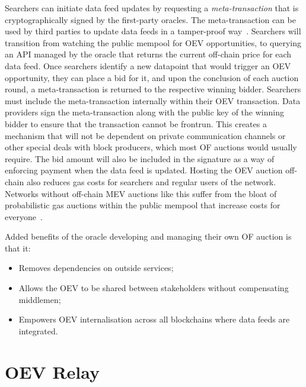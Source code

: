 \documentclass[11pt]{article}
\begin{document}
Searchers can initiate data feed updates by requesting a \textit{meta-transaction} that is cryptographically signed by the first-party oracles.
The meta-transaction can be used by third parties to update data feeds in a tamper-proof way~\cite{airnode-sign}.
Searchers will transition from watching the public mempool for OEV opportunities, to querying an API managed by the oracle that returns the current off-chain price for each data feed.
Once searchers identify a new datapoint that would trigger an OEV opportunity, they can place a bid for it, and upon the conclusion of each auction round, a meta-transaction is returned to the respective winning bidder.
Searchers must include the meta-transaction internally within their OEV transaction.
Data providers sign the meta-transaction along with the public key of the winning bidder to ensure that the transaction cannot be frontrun.
This creates a mechanism that will not be dependent on private communication channels or other special deals with block producers, which most OF auctions would usually require.
The bid amount will also be included in the signature as a way of enforcing payment when the data feed is updated.
Hosting the OEV auction off-chain also reduces gas costs for searchers and regular users of the network.
Networks without off-chain MEV auctions like this suffer from the bloat of probabilistic gas auctions within the public mempool that increase costs for everyone~\cite{Daian:2019}.

Added benefits of the oracle developing and managing their own OF auction is that it:
\begin{itemize}
	\item Removes dependencies on outside services;
	\item Allows the OEV to be shared between stakeholders without compensating middlemen;
	\item Empowers OEV internalisation across all blockchains where data feeds are integrated.
\end{itemize}

\section{OEV Relay}
\end{document}
